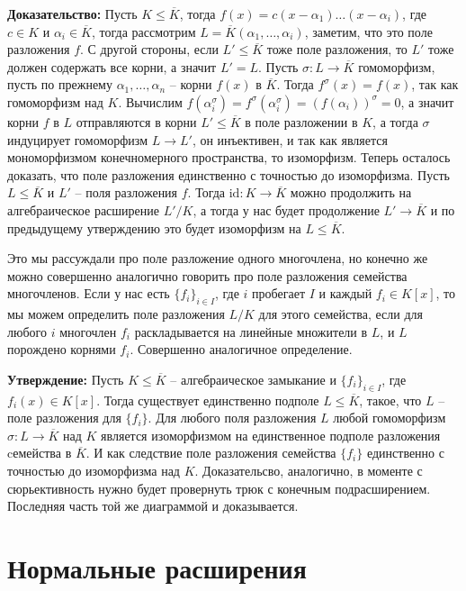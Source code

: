\documentclass[a4paper, 12pt]{book}
\begin{document}
\textbf{Доказательство:} Пусть $K\le\overline K$, тогда $f(x)=c(x-\alpha_1)\ldots
(x-\alpha_i)$, где $c\in K$ и $\alpha_i\in\overline K$, тогда рассмотрим $L=
\overline K(\alpha_1,\ldots,\alpha_i)$, заметим, что это поле разложения $f$.
С другой стороны, если $L'\le\overline K$ тоже поле разложения, то $L'$ тоже
должен содержать все корни, а значит $L'=L$. Пусть $\sigma:L\rightarrow\overline
K$ гомоморфизм, пусть по прежнему $\alpha_1,\ldots,\alpha_n$ – корни $f(x)$ в
$\overline K$. Тогда $f^\sigma(x)=f(x)$, так как гомоморфизм над $K$. Вычислим
$f(\alpha_i^\sigma)=f^\sigma(\alpha_i^\sigma)=(f(\alpha_i))^\sigma=0$, а значит
корни $f$ в $L$ отправляются в корни $L'\le\overline K$ в поле разложении в $K$,
а тогда $\sigma$ индуцирует гомоморфизм $L\rightarrow L'$, он инъективен, и так
как является мономорфизмом конечномерного пространства, то изоморфизм. Теперь
осталось доказать, что поле разложения единственно с точностью до изоморфизма.
Пусть $L\le\overline K$ и $L'$ – поля разложения $f$. Тогда $\text{id}:K
\rightarrow\overline K$ можно продолжить на алгебраическое расширение $L'/K$,
а тогда у нас будет продолжение $L'\rightarrow\overline K$ и по предыдущему
утверждению это будет изоморфизм на $L\le\overline K$.

Это мы рассуждали про поле разложение одного многочлена, но конечно же можно
совершенно аналогично говорить про поле разложения семейства многочленов. Если
у нас есть $\{f_i\}_{i\in I}$, где $i$ пробегает $I$ и каждый $f_i\in K[x]$, то
мы можем определить поле разложения $L/K$ для этого семейства, если для любого
$i$ многочлен $f_i$ раскладывается на линейные множители в $L$, и $L$ порождено
корнями $f_i$. Совершенно аналогичное определение.

\textbf{Утверждение:} Пусть $K\leq\overline K$ – алгебраическое замыкание и
$\{f_i\}_{i\in I}$, где $f_i(x)\in K[x]$. Тогда существует единственно подполе
$L\le\overline K$, такое, что $L$ – поле разложения для $\{f_i\}$. Для любого
поля разложения $L$ любой гомоморфизм $\sigma:L\rightarrow\overline K$ над $K$
является изоморфизмом на единственное подполе разложения cемейства в $\overline
K$. И как следствие поле разложения семейства $\{f_i\}$ единственно с точностью
до изоморфизма над $K$. Доказательсво, аналогично, в моменте с сюрьективность
нужно будет провернуть трюк с конечным подрасширением. Последняя часть той же
диаграммой и доказывается.

\section{Нормальные расширения}
\end{document}
